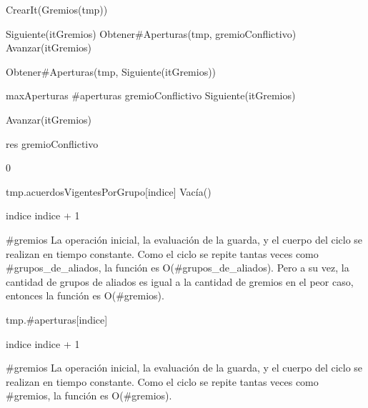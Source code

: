 {
	\state {} \asig CrearIt(Gremios(tmp))						
	\state

	\state {} \asig Siguiente(itGremios)				
	\state {} \asig Obtener\#Aperturas(tmp, gremioConflictivo)		
	\state Avanzar(itGremios)																
	\state

																	
		\state

		\state {} \asig Obtener\#Aperturas(tmp, Siguiente(itGremios))		

									

			\state maxAperturas \asig \#aperturas						
			\state gremioConflictivo \asig Siguiente(itGremios)			
		\endif

		\state
		\state Avanzar(itGremios)										
	\endwhile
	\state

	\state res \asig gremioConflictivo									
}
{0}
{\addtocounter{lipsumcounter}{1}}

{
	\state {} 									
				
		\state

		\state tmp.acuerdosVigentesPorGrupo[indice] \asig Vacía()		

		\state
		\state indice \asig indice + 1									
	\endwhile

}
{\#gremios}
{ La operación inicial, la evaluación de la guarda, y el cuerpo del ciclo se realizan en tiempo constante. Como el ciclo se repite tantas veces como \#grupos\_de\_aliados, la función es O(\#grupos\_de\_aliados). Pero a su vez, la cantidad de grupos de aliados es igual a la cantidad de gremios en el peor caso, entonces la función es O(\#gremios). }

{
	\state {} 					
			
		\state

		\state tmp.\#aperturas[indice] 			

		\state
		\state indice \asig indice + 1					
	\endwhile
}
{\#gremios}
{ La operación inicial, la evaluación de la guarda, y el cuerpo del ciclo se realizan en tiempo constante. Como el ciclo se repite tantas veces como \#gremios, la función es O(\#gremios). }

